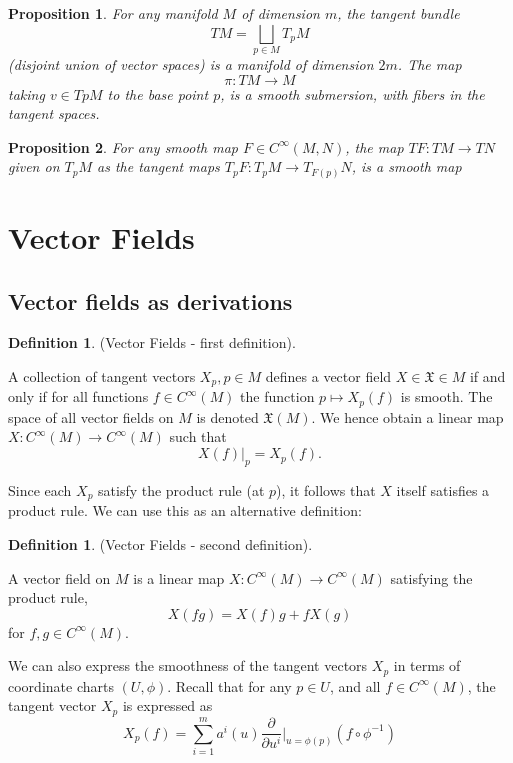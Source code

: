 \documentclass{article}
\newtheorem{proposition}{Proposition}[theorem]
\theoremstyle{definition}
\newtheorem{defn}[theorem]{Definition}
\newenvironment{definition}
  {\vspace{8pt}\begin{mdframed}[backgroundcolor=blueish,innertopmargin=4]\begin{defn}}
  {\end{defn}\end{mdframed}\vspace{4pt}}
\begin{document}
\begin{proposition}
For any manifold $M$ of dimension $m$, the tangent bundle
\[
    TM = \bigsqcup_{p\in M} T_p M
\]
(disjoint union of vector spaces) is a manifold of dimension $2m$. The map 
\[
    \pi : TM \rightarrow M
\]
taking $v \in TpM$ to the base point $p$, is a smooth submersion, with fibers in the tangent spaces.

\end{proposition}

\begin{proposition}

For any smooth map $F \in C^\infty(M,N)$, the map $T F : TM \rightarrow TN$ given on $T_pM$ as the tangent maps $T_pF : T_pM \rightarrow T_{F(p)}N$, is a smooth map
\end{proposition}

\newpage 
\section{Vector Fields}

\subsection{Vector fields as derivations}
\begin{definition} (Vector Fields - first definition).

A collection of tangent vectors $X_p, p \in M$ defines a vector field $X \in \mathfrak X \in M$ if and only if for all functions $f \in C^\infty(M)$ the function $p \mapsto X_p(f)$ is smooth. The space of all vector fields on $M$ is denoted $\mathfrak X(M)$. We hence obtain a linear map $X : C^\infty(M) \rightarrow C^\infty(M)$ such that 
\[
    X (f)|_p = X_p(f).
\]
\end{definition}
Since each $X_p$ satisfy the product rule (at $p$), it follows that $X$ itself satisfies a product rule. We can use this as an alternative definition:

\begin{definition} (Vector Fields - second definition).

A vector field on $M$ is a linear map $X : C^\infty (M) \rightarrow C^\infty (M)$ satisfying the product rule, 
\[
    X(f g) = X(f)g + f X(g)
\]
for $f,g \in C^\infty(M)$.
\end{definition}

We can also express the smoothness of the tangent vectors $X_p$ in terms of coordinate charts $(U,\phi)$. Recall that for any $p \in U$, and all $f \in C^\infty(M)$, the tangent vector $X_p$ is expressed as
\[
    X_p(f) = \sum_{i=1}^m a^i (u) \frac{\partial}{\partial u^i} \Bigr |_{u=\phi(p)}  (f \circ \phi^{-1})
\]
\end{document}
